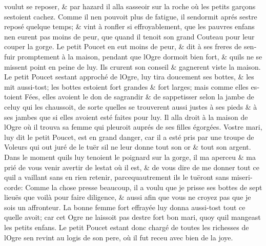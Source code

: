 \documentclass[14pt,a4paper]{memoir}
\begin{document}
\begin{otherlanguage}{french}
voulut se reposer, \& par hazard il alla s\textquotesingle asseoir sur
la roche où les petits garçons s\textquotesingle estoient cachez. Comme
il n\textquotesingle en pouvoit plus de fatigue, il
s\textquotesingle endormit aprés s\textquotesingle estre reposé quelque
temps; \& vint à ronfler si effroyablement, que les pauvres enfans
n\textquotesingle en eurent pas moins de peur, que quand il tenoit son
grand Couteau pour leur couper la gorge. Le petit Poucet en eut moins de
peur, \& dit à ses freres de s\textquotesingle enfuir promptement à la
maison, pendant que l\textquotesingle Ogre dormoit bien fort, \&
qu\textquotesingle ils ne se missent point en peine de luy. Ils crurent
son conseil \& gagnerent viste la maison. Le petit Poucet
s\textquotesingle estant approché de l\textquotesingle Ogre, luy tira
doucement ses bottes, \& les mit aussi-tost; les bottes estoient fort
grandes \& fort larges; mais comme elles estoient Fées, elles avoient le
don de s\textquotesingle agrandir \& de s\textquotesingle appetisser
selon la jambe de celuy qui les chaussoit, de sorte
qu\textquotesingle elles se trouverent aussi justes à ses pieds \& à ses
jambes que si elles avoient esté faites pour luy. Il alla droit à la
maison de l\textquotesingle Ogre où il trouva sa femme qui pleuroit
auprés de ses filles égorgées. Vostre mari, luy dit le petit Poucet, est
en grand danger, car il a esté pris par une troupe de Voleurs qui out
juré de le tuër s\textquotesingle il ne leur donne tout son or \& tout
son argent. Dans le moment qu\textquotesingle ils luy tenoient le
poignard sur la gorge, il m\textquotesingle a aperceu \&
m\textquotesingle a prié de vous venir avertir de
l\textquotesingle estat où il est, \& de vous dire de me donner tout ce
qu\textquotesingle il a vaillant sans en rien retenir,
parcequ\textquotesingle autrement ils le tuëront sans misericorde: Comme
la chose presse beaucoup, il a voulu que je prisse ses bottes de sept
lieuës que voilà pour faire diligence, \& aussi afin que vous ne croyez
pas que je sois un affronteur. La bonne femme fort effrayée luy donna
aussi-tost tout ce qu\textquotesingle elle avoit; car cet Ogre ne
laissoit pas d\textquotesingle estre fort bon mari, quoy
qu\textquotesingle il mangeast les petits enfans. Le petit Poucet estant
donc chargé de toutes les richesses de l\textquotesingle Ogre
s\textquotesingle en revint au logis de son pere, où il fut receu avec
bien de la joye.


\end{otherlanguage}
\end{document}

